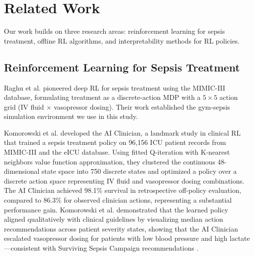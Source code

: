 
\section{Related Work}\label{sec:related}

Our work builds on three research areas: reinforcement learning for sepsis treatment, offline RL algorithms, and interpretability methods for RL policies.

\subsection{Reinforcement Learning for Sepsis Treatment}\label{sec:related:sepsis}

Raghu et al. \citeyearpar{raghu2017sepsis_drl} pioneered deep RL for sepsis treatment using the MIMIC-III database, formulating treatment as a discrete-action MDP with a $5 \times 5$ action grid (IV fluid × vasopressor dosing). Their work established the gym-sepsis simulation environment we use in this study.

Komorowski et al. \citeyearpar{komorowski2018ai_clinician} developed the AI Clinician, a landmark study in clinical RL that trained a sepsis treatment policy on 96,156 ICU patient records from MIMIC-III and the eICU database. Using fitted Q-iteration with K-nearest neighbors value function approximation, they clustered the continuous 48-dimensional state space into 750 discrete states and optimized a policy over a discrete action space representing IV fluid and vasopressor dosing combinations. The AI Clinician achieved 98.1\% survival in retrospective off-policy evaluation, compared to 86.3\% for observed clinician actions, representing a substantial performance gain. Komorowski et al. demonstrated that the learned policy aligned qualitatively with clinical guidelines by visualizing median action recommendations across patient severity states, showing that the AI Clinician escalated vasopressor dosing for patients with low blood pressure and high lactate—consistent with Surviving Sepsis Campaign recommendations \citep{rhodes2017ssc}.

